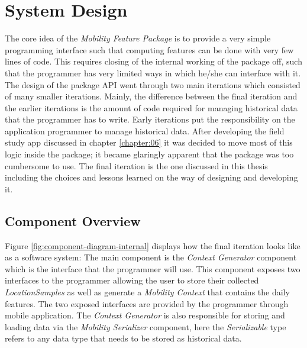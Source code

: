 \section{System Design}
The core idea of the \textit{Mobility Feature Package} is to provide a very simple programming interface such that computing features can be done with very few lines of code. This requires closing of the internal working of the package off, such that the programmer has very limited ways in which he/she can interface with it. The design of the package API went through two main iterations which consisted of many smaller iterations. Mainly, the difference between the final iteration and the earlier iterations is the amount of code required for managing historical data that the programmer has to write. Early iterations put the responsibility on the application programmer to manage historical data. After developing the field study app discussed in chapter \ref{chapter:06} it was decided to move most of this logic inside the package; it became glaringly apparent that the package was too cumbersome to use. The final iteration is the one discussed in this thesis including the choices and lessons learned on the way of designing and developing it. 


\subsection{Component Overview}
Figure \ref{fig:component-diagram-internal} displays how the final iteration looks like as a software system: The main component is the \textit{Context Generator} component which is the interface that the programmer will use. This component exposes two interfaces to the programmer allowing the user to store their collected \textit{LocationSamples} as well as generate a \textit{Mobility Context} that contains the daily features. The two exposed interfaces are provided by the programmer through mobile application. The \textit{Context Generator} is also responsible for storing and loading data via the \textit{Mobility Serializer} component, here the \textit{Serializable} type refers to any data type that needs to be stored as historical data.

